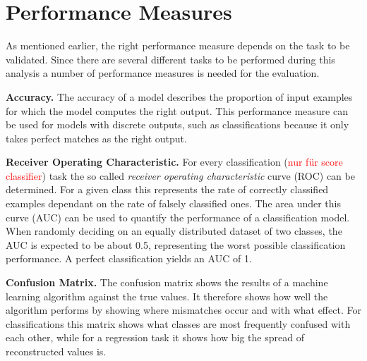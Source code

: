 \section{Performance Measures}
%
As mentioned earlier, the right performance measure depends on the task to be
validated. Since there are several different tasks to be performed during this
analysis a number of performance measures is needed for the evaluation.

\textbf{Accuracy.} The accuracy of a model describes the proportion of input
examples for which the model computes the right output. This performance
measure can be used for models with discrete outputs, such as classifications
because it only takes perfect matches as the right output.

\textbf{Receiver Operating Characteristic.} For every classification (\textcolor{red}{nur für score classifier}) task the
so called \textit{receiver operating characteristic} curve (ROC) can be
determined. For a given class this represents the rate of correctly classified
examples dependant on the rate of falsely classified ones. The area under this
curve (AUC) can be used to quantify the performance of a classification model.
When randomly deciding on an equally distributed dataset of two classes, the
AUC is expected to be about \num{0.5}, representing the worst possible
classification performance. A perfect classification yields an AUC of \num{1}.

\textbf{Confusion Matrix.} The confusion matrix shows the results of a machine
learning algorithm against the true values. It therefore shows how well the
algorithm performs by showing where mismatches occur and with what effect. For
classifications this matrix shows what classes are most frequently confused
with each other, while for a regression task it shows how big the spread of
reconstructed values is.


